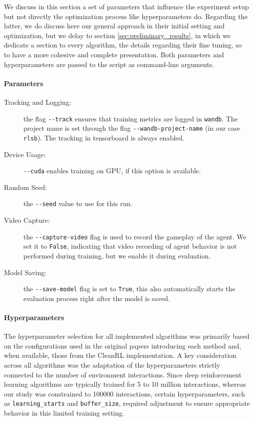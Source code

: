 We discuss in this section a set of parameters that influence the experiment setup but not directly the optimization process like hyperparameters do. Regarding the latter, we do discuss here our general approach in their initial setting and optimization, but we delay to section \ref{sec:preliminary_results}, in which we dedicate a section to every algorithm, the details regarding their fine tuning, so to have a more cohesive and complete presentation. Both parameters and hyperparameters are passed to the script as command-line arguments.

\paragraph{Parameters}
\begin{description}
	\item[Tracking and Logging:] the flag \verb*|--track| ensures that training metrics are logged in \verb*|wandb|. The project name is set through the flag \verb*|--wandb-project-name| (in our case \texttt{rlsb}). The tracking in tensorboard is always enabled.
    \item[Device Usage:] \verb|--cuda| enables training on GPU, if this option is available.
	\item[Random Seed:] the \verb|--seed| value to use for this run.
	\item[Video Capture:] the \verb|--capture-video| flag is used to record the gameplay of the agent. We set it to \verb|False|, indicating that video recording of agent behavior is not performed during training, but we enable it during evaluation.
	\item[Model Saving:] the \verb|--save-model| flag is set to \verb|True|, this also automatically starts the evaluation process right after the model is saved.
\end{description}

\paragraph{Hyperparameters}
The hyperparameter selection for all implemented algorithms was primarily based on the configurations used in the original papers introducing each method and, when available, those from the CleanRL implementation. A key consideration across all algorithms was the adaptation of the hyperparameters strictly connected to the number of environment interactions. Since deep reinforcement learning algorithms are typically trained for 5 to 10 million interactions, whereas our study was constrained to \num{100000} interactions, certain hyperparameters, such as \texttt{learning\_starts} and \texttt{buffer\_size}, required adjustment to ensure appropriate behavior in this limited training setting.


